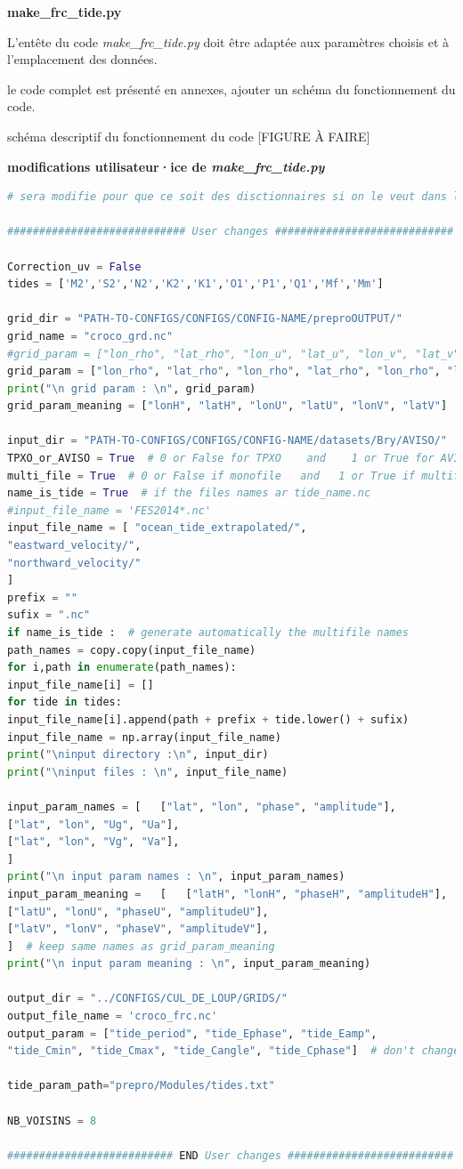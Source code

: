 \documentclass[10pt,a4paper,titlepage]{article}
\begin{document}
\textbf{make\_frc\_tide.py}

L'entête du code \textit{make\_frc\_tide.py} doit être adaptée aux paramètres choisis et à l'emplacement des données.

le code complet est présenté en annexes, ajouter un schéma du fonctionnement du code.

schéma descriptif du fonctionnement du code [FIGURE À FAIRE]

\begin{codeEnv}{\textbf{modifications utilisateur·ice de \textit{make\_frc\_tide.py}}}
\begin{lstlisting}[language=python]
# sera modifie pour que ce soit des disctionnaires si on le veut dans le rapport

############################ User changes ############################

Correction_uv = False
tides = ['M2','S2','N2','K2','K1','O1','P1','Q1','Mf','Mm']

grid_dir = "PATH-TO-CONFIGS/CONFIGS/CONFIG-NAME/preproOUTPUT/"
grid_name = "croco_grd.nc"
#grid_param = ["lon_rho", "lat_rho", "lon_u", "lat_u", "lon_v", "lat_v"]
grid_param = ["lon_rho", "lat_rho", "lon_rho", "lat_rho", "lon_rho", "lat_rho"]
print("\n grid param : \n", grid_param)
grid_param_meaning = ["lonH", "latH", "lonU", "latU", "lonV", "latV"]  # don't change this order

input_dir = "PATH-TO-CONFIGS/CONFIGS/CONFIG-NAME/datasets/Bry/AVISO/"
TPXO_or_AVISO = True  # 0 or False for TPXO    and    1 or True for AVISO
multi_file = True  # 0 or False if monofile   and   1 or True if multifile
name_is_tide = True  # if the files names ar tide_name.nc
#input_file_name = 'FES2014*.nc'
input_file_name = [ "ocean_tide_extrapolated/",
"eastward_velocity/",
"northward_velocity/"
]
prefix = ""
sufix = ".nc"
if name_is_tide :  # generate automatically the multifile names
path_names = copy.copy(input_file_name)
for i,path in enumerate(path_names):
input_file_name[i] = []
for tide in tides:
input_file_name[i].append(path + prefix + tide.lower() + sufix)
input_file_name = np.array(input_file_name)
print("\ninput directory :\n", input_dir)
print("\ninput files : \n", input_file_name)

input_param_names = [   ["lat", "lon", "phase", "amplitude"],
["lat", "lon", "Ug", "Ua"],
["lat", "lon", "Vg", "Va"],
]
print("\n input param names : \n", input_param_names)
input_param_meaning =   [   ["latH", "lonH", "phaseH", "amplitudeH"],
["latU", "lonU", "phaseU", "amplitudeU"],
["latV", "lonV", "phaseV", "amplitudeV"],
]  # keep same names as grid_param_meaning
print("\n input param meaning : \n", input_param_meaning)

output_dir = "../CONFIGS/CUL_DE_LOUP/GRIDS/"
output_file_name = 'croco_frc.nc'
output_param = ["tide_period", "tide_Ephase", "tide_Eamp",
"tide_Cmin", "tide_Cmax", "tide_Cangle", "tide_Cphase"]  # don't change the order

tide_param_path="prepro/Modules/tides.txt"

NB_VOISINS = 8

########################## END User changes ##########################
\end{lstlisting}
\end{codeEnv}
\end{document}
